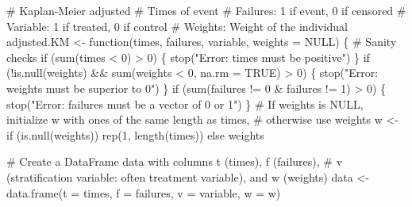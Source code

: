 \documentclass[
  11pt,
  a4paper,
]{article}
\newenvironment{Shaded}{}{}
\newcommand{\AttributeTok}[1]{\textcolor[rgb]{0.84,0.23,0.29}{#1}}
\newcommand{\CommentTok}[1]{\textcolor[rgb]{0.42,0.45,0.49}{#1}}
\newcommand{\ConstantTok}[1]{\textcolor[rgb]{0.00,0.36,0.77}{#1}}
\newcommand{\ControlFlowTok}[1]{\textcolor[rgb]{0.84,0.23,0.29}{#1}}
\newcommand{\DecValTok}[1]{\textcolor[rgb]{0.00,0.36,0.77}{#1}}
\newcommand{\FunctionTok}[1]{\textcolor[rgb]{0.44,0.26,0.76}{#1}}
\newcommand{\NormalTok}[1]{\textcolor[rgb]{0.14,0.16,0.18}{#1}}
\newcommand{\OtherTok}[1]{\textcolor[rgb]{0.44,0.26,0.76}{#1}}
\newcommand{\SpecialCharTok}[1]{\textcolor[rgb]{0.00,0.36,0.77}{#1}}
\newcommand{\StringTok}[1]{\textcolor[rgb]{0.01,0.18,0.38}{#1}}
\theoremstyle{plain}
\theoremstyle{plain}
\theoremstyle{plain}
\theoremstyle{definition}
\theoremstyle{remark}
\begin{document}
\begin{Shaded}
\begin{Highlighting}[]
\CommentTok{\# Kaplan{-}Meier adjusted}
\CommentTok{\# Times of event }
\CommentTok{\# Failures:  1 if event, 0 if censored}
\CommentTok{\# Variable:  1 if treated, 0 if control}
\CommentTok{\# Weights:  Weight of the individual}
\NormalTok{adjusted.KM }\OtherTok{\textless{}{-}} \ControlFlowTok{function}\NormalTok{(times, failures, variable, }\AttributeTok{weights =} \ConstantTok{NULL}\NormalTok{) \{}
  \CommentTok{\# Sanity checks}
  \ControlFlowTok{if}\NormalTok{ (}\FunctionTok{sum}\NormalTok{(times }\SpecialCharTok{\textless{}} \DecValTok{0}\NormalTok{) }\SpecialCharTok{\textgreater{}} \DecValTok{0}\NormalTok{) \{}
    \FunctionTok{stop}\NormalTok{(}\StringTok{"Error: times must be positive"}\NormalTok{)}
\NormalTok{  \}}
  \ControlFlowTok{if}\NormalTok{ (}\SpecialCharTok{!}\FunctionTok{is.null}\NormalTok{(weights) }\SpecialCharTok{\&\&} \FunctionTok{sum}\NormalTok{(weights }\SpecialCharTok{\textless{}} \DecValTok{0}\NormalTok{, }\AttributeTok{na.rm =} \ConstantTok{TRUE}\NormalTok{) }\SpecialCharTok{\textgreater{}} \DecValTok{0}\NormalTok{) \{}
    \FunctionTok{stop}\NormalTok{(}\StringTok{"Error: weights must be superior to 0"}\NormalTok{)}
\NormalTok{  \}}
  \ControlFlowTok{if}\NormalTok{ (}\FunctionTok{sum}\NormalTok{(failures }\SpecialCharTok{!=} \DecValTok{0} \SpecialCharTok{\&}\NormalTok{ failures }\SpecialCharTok{!=} \DecValTok{1}\NormalTok{) }\SpecialCharTok{\textgreater{}} \DecValTok{0}\NormalTok{) \{}
    \FunctionTok{stop}\NormalTok{(}\StringTok{"Error: failures must be a vector of 0 or 1"}\NormalTok{)}
\NormalTok{  \}}
  \CommentTok{\# If \textquotesingle{}weights\textquotesingle{} is NULL, initialize \textquotesingle{}w\textquotesingle{} with ones of the same length as \textquotesingle{}times\textquotesingle{}, }
  \CommentTok{\# otherwise use \textquotesingle{}weights\textquotesingle{}}
\NormalTok{  w }\OtherTok{\textless{}{-}} \ControlFlowTok{if}\NormalTok{ (}\FunctionTok{is.null}\NormalTok{(weights)) }\FunctionTok{rep}\NormalTok{(}\DecValTok{1}\NormalTok{, }\FunctionTok{length}\NormalTok{(times)) }\ControlFlowTok{else}\NormalTok{ weights}
  
  \CommentTok{\# Create a DataFrame \textquotesingle{}data\textquotesingle{} with columns t (times), f (failures), }
  \CommentTok{\# v (stratification variable: often treatment variable), and w (weights)}
\NormalTok{  data }\OtherTok{\textless{}{-}} \FunctionTok{data.frame}\NormalTok{(}\AttributeTok{t =}\NormalTok{ times, }\AttributeTok{f =}\NormalTok{ failures, }\AttributeTok{v =}\NormalTok{ variable, }\AttributeTok{w =}\NormalTok{ w)}
  

\end{Highlighting}
\end{Shaded}
\end{document}
